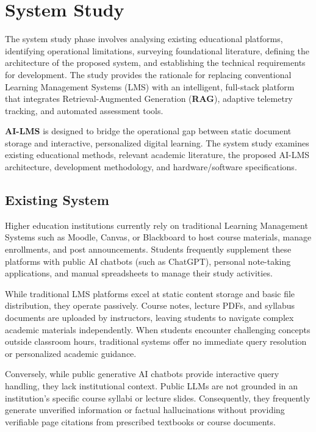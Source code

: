 \chapter{System Study}

The system study phase involves analysing existing educational platforms, identifying operational limitations, surveying foundational literature, defining the architecture of the proposed system, and establishing the technical requirements for development. The study provides the rationale for replacing conventional Learning Management Systems (LMS) with an intelligent, full-stack platform that integrates Retrieval-Augmented Generation (\textbf{RAG}), adaptive telemetry tracking, and automated assessment tools.

\textbf{AI-LMS} is designed to bridge the operational gap between static document storage and interactive, personalized digital learning. The system study examines existing educational methods, relevant academic literature, the proposed AI-LMS architecture, development methodology, and hardware/software specifications.

\section{Existing System}

Higher education institutions currently rely on traditional Learning Management Systems such as Moodle, Canvas, or Blackboard to host course materials, manage enrollments, and post announcements. Students frequently supplement these platforms with public AI chatbots (such as ChatGPT), personal note-taking applications, and manual spreadsheets to manage their study activities.

While traditional LMS platforms excel at static content storage and basic file distribution, they operate passively. Course notes, lecture PDFs, and syllabus documents are uploaded by instructors, leaving students to navigate complex academic materials independently. When students encounter challenging concepts outside classroom hours, traditional systems offer no immediate query resolution or personalized academic guidance.

Conversely, while public generative AI chatbots provide interactive query handling, they lack institutional context. Public LLMs are not grounded in an institution's specific course syllabi or lecture slides. Consequently, they frequently generate unverified information or factual hallucinations without providing verifiable page citations from prescribed textbooks or course documents.

